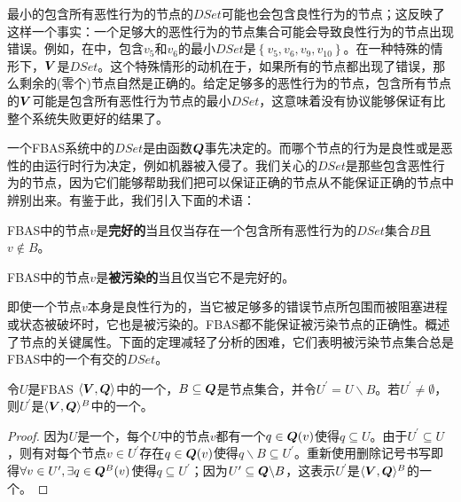 最小的包含所有恶性行为的节点的$DSet$可能也会包含良性行为的节点；这反映了这样一个事实：一个足够大的恶性行为的节点集合可能会导致良性行为的节点出现错误。例如，在中，包含$v_5$和$v_6$的最小$DSet$是$\left\{v_5,v_6,v_9,v_{10}\right\}$。在一种特殊的情形下，${\bm V}$是$DSet$。这个特殊情形的动机在于，如果所有的节点都出现了错误，那么剩余的(零个)节点自然是正确的。给定足够多的恶性行为的节点，包含所有节点的${\bm V}$可能是包含所有恶性行为节点的最小$DSet$，这意味着没有协议能够保证有比整个系统失败更好的结果了。

一个FBAS系统中的$DSet$是由{\quorum}函数${\bm Q}$事先决定的。而哪个节点的行为是良性或是恶性的由运行时行为决定，例如机器被入侵了。我们关心的$DSet$是那些包含恶性行为的节点，因为它们能够帮助我们把可以保证正确的节点从不能保证正确的节点中辨别出来。有鉴于此，我们引入下面的术语：

\begin{definition}[完好的]
        FBAS中的节点$v$是\textbf{完好的}当且仅当存在一个包含所有恶性行为的$DSet$集合$B$且$v\not\in B$。
\end{definition}

\begin{definition}[被污染的]
        FBAS中的节点$v$是\textbf{被污染的}当且仅当它不是完好的。
\end{definition}

即使一个节点$v$本身是良性行为的，当它被足够多的错误节点所包围而被阻塞进程或状态被破坏时，它也是被污染的。FBAS都不能保证被污染节点的正确性。概述了节点的关键属性。下面的定理减轻了分析的困难，它们表明被污染节点集合总是FBAS中的一个有{\quorum}交的$DSet$。

\begin{theorem}\label{thm:quorum_subset_is_quorum}
        令$U$是FBAS $\langle{\bm V},{\bm Q}\rangle$中的一个{\quorum}，$B\subseteq {\bm Q}$是节点集合，并令$U^\prime=U\backslash B$。若$U^\prime\neq \emptyset$，则$U^\prime$是$\langle{\bm V},{\bm Q}\rangle^B$中的一个{\quorum}。
\end{theorem}

\begin{proof}
        因为$U$是一个{\quorum}，每个$U$中的节点$v$都有一个$q\in{\bm Q}(v)$使得$q\subseteq U$。由于$U^\prime\subseteq U$，则有对每个节点$v\in U^\prime$存在$q\in{\bm Q}(v)$使得$q\backslash B\subseteq U^\prime$。重新使用删除记号书写即得$\forall v\in U^\prime,\exists q\in{\bm Q}^B(v)$使得$q\subseteq U^\prime$；因为$U^\prime \subseteq {\bm Q}\backslash B$，这表示$U^\prime$是$\langle{\bm V},{\bm Q}\rangle^B$的一个{\quorum}。
\end{proof}


